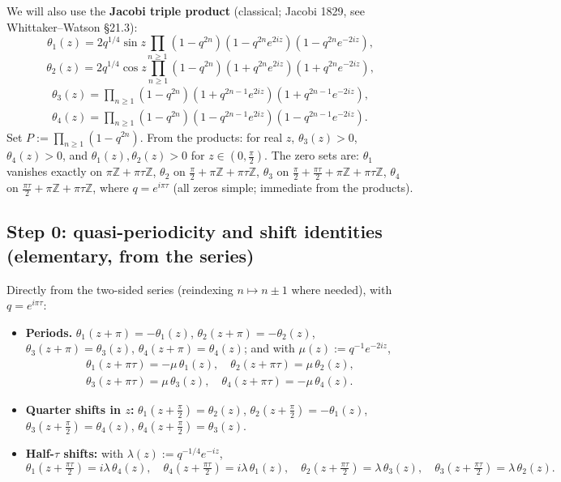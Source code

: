 \documentclass[11pt]{article}
\theoremstyle{remark}
\begin{document}
We will also use the \textbf{Jacobi triple product} (classical; Jacobi 1829, see Whittaker--Watson \S21.3):
\[\theta_1(z)=2q^{1/4}\sin z\prod_{n\ge1}(1-q^{2n})(1-q^{2n}e^{2iz})(1-q^{2n}e^{-2iz}),\]
\[\theta_2(z)=2q^{1/4}\cos z\prod_{n\ge1}(1-q^{2n})(1+q^{2n}e^{2iz})(1+q^{2n}e^{-2iz}),\]
\[\begin{gathered}\theta_3(z)=\prod_{n\ge1}(1-q^{2n})(1+q^{2n-1}e^{2iz})(1+q^{2n-1}e^{-2iz}),\\
\theta_4(z)=\prod_{n\ge1}(1-q^{2n})(1-q^{2n-1}e^{2iz})(1-q^{2n-1}e^{-2iz}).\end{gathered}\]
Set $P:=\prod_{n\ge1}(1-q^{2n})$. From the products: for real $z$, $\theta_3(z)>0$, $\theta_4(z)>0$, and $\theta_1(z),\theta_2(z)>0$ for $z\in(0,\tfrac\pi2)$. The zero sets are: $\theta_1$ vanishes exactly on $\pi\mathbb Z+\pi\tau\mathbb Z$, $\theta_2$ on $\tfrac\pi2+\pi\mathbb Z+\pi\tau\mathbb Z$, $\theta_3$ on $\tfrac\pi2+\tfrac{\pi\tau}2+\pi\mathbb Z+\pi\tau\mathbb Z$, $\theta_4$ on $\tfrac{\pi\tau}2+\pi\mathbb Z+\pi\tau\mathbb Z$, where $q=e^{i\pi\tau}$ (all zeros simple; immediate from the products).

\subsection*{Step 0: quasi-periodicity and shift identities (elementary, from the series)}

Directly from the two-sided series (reindexing $n\mapsto n\pm1$ where needed), with $q=e^{i\pi\tau}$:

\begin{itemize}
\item \textbf{Periods.} $\theta_1(z+\pi)=-\theta_1(z)$, $\theta_2(z+\pi)=-\theta_2(z)$, $\theta_3(z+\pi)=\theta_3(z)$, $\theta_4(z+\pi)=\theta_4(z)$; and with $\mu(z):=q^{-1}e^{-2iz}$,
\[\begin{gathered}\theta_1(z+\pi\tau)=-\mu\,\theta_1(z),\quad \theta_2(z+\pi\tau)=\mu\,\theta_2(z),\\ \theta_3(z+\pi\tau)=\mu\,\theta_3(z),\quad \theta_4(z+\pi\tau)=-\mu\,\theta_4(z).\end{gathered}\]
\item \textbf{Quarter shifts in $z$:} $\theta_1(z+\tfrac\pi2)=\theta_2(z)$, $\theta_2(z+\tfrac\pi2)=-\theta_1(z)$, $\theta_3(z+\tfrac\pi2)=\theta_4(z)$, $\theta_4(z+\tfrac\pi2)=\theta_3(z)$.
\item \textbf{Half-$\tau$ shifts:} with $\lambda(z):=q^{-1/4}e^{-iz}$,
\[\theta_1(z+\tfrac{\pi\tau}2)=i\lambda\,\theta_4(z),\quad \theta_4(z+\tfrac{\pi\tau}2)=i\lambda\,\theta_1(z),\quad
\theta_2(z+\tfrac{\pi\tau}2)=\lambda\,\theta_3(z),\quad \theta_3(z+\tfrac{\pi\tau}2)=\lambda\,\theta_2(z).\]
\end{itemize}
\end{document}
